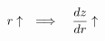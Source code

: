 \documentclass[preview]{standalone}
\begin{document}
\begin{align*}
\special{dvisvgm:raw <g id='unique000'>}r\uparrow\quad\Longrightarrow\quad\frac{dz}{dr}\uparrow\special{dvisvgm:raw </g>}
\end{align*}
\end{document}
